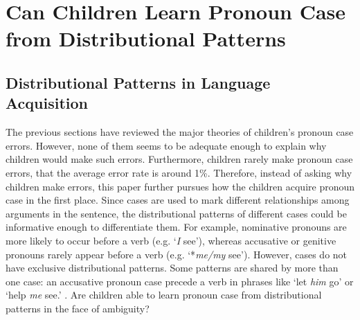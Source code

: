 \section{Can Children Learn Pronoun Case from Distributional Patterns}
\subsection{Distributional Patterns in Language Acquisition}
 
The previous sections have reviewed the major theories of children's pronoun case errors. However, none of them seems to be adequate enough to explain why children would make such errors. Furthermore, children rarely make pronoun case errors, that the average error rate is around 1\%. Therefore, instead of asking why children make errors, this paper further pursues how the children acquire pronoun case in the first place. Since cases are used to mark different relationships among arguments in the sentence, the distributional patterns of different cases could be informative enough to differentiate them. For example,  nominative pronouns are more likely to occur before a verb (e.g. `\textit{I} see'), whereas accusative or genitive pronouns rarely appear before a verb (e.g. `*\textit{me/my} see'). However, cases do not have exclusive distributional patterns. Some patterns are shared by more than one case: an accusative pronoun case precede a verb in phrases like `let \textit{him} go' or `help \textit{me} see.' \citep{tomasello2000}. Are children able to learn pronoun case from distributional patterns in the face of ambiguity?

